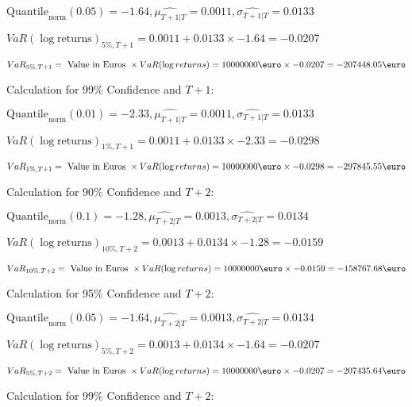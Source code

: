 \indent\indent $\text{Quantile}_\text{norm}(0.05) = -1.64,\hat{\mu_{T+1|T}} = 0.0011, \hat{\sigma_{T+1|T}} = 0.0133$

\indent\indent $VaR(\log \text{returns})_{5\%, T + 1} = 0.0011 + 0.0133\times-1.64 = -0.0207$

\indent\indent $VaR_{5\%, T + 1} = \text{ Value in Euros } \times VaR(\log returns) = 10 000 000 \text{\euro} \times-0.0207 = -207448.05 \text{\euro}$\newline




Calculation for 99\% Confidence and $T+1$:

\indent\indent $\text{Quantile}_\text{norm}(0.01) = -2.33,\hat{\mu_{T+1|T}} = 0.0011, \hat{\sigma_{T+1|T}} = 0.0133$

\indent\indent $VaR(\log \text{returns})_{1\%, T + 1} = 0.0011 + 0.0133\times-2.33 = -0.0298$

\indent\indent $VaR_{1\%, T + 1} = \text{ Value in Euros } \times VaR(\log returns) = 10 000 000 \text{\euro} \times-0.0298 = -297845.55 \text{\euro}$\newline




Calculation for 90\% Confidence and $T+2$:

\indent\indent $\text{Quantile}_\text{norm}(0.1) = -1.28,\hat{\mu_{T+2|T}} = 0.0013, \hat{\sigma_{T+2|T}} = 0.0134$

\indent\indent $VaR(\log \text{returns})_{10\%, T + 2} = 0.0013 + 0.0134\times-1.28 = -0.0159$

\indent\indent $VaR_{10\%, T + 2} = \text{ Value in Euros } \times VaR(\log returns) = 10 000 000 \text{\euro} \times-0.0159 = -158767.68 \text{\euro}$\newline




Calculation for 95\% Confidence and $T+2$:

\indent\indent $\text{Quantile}_\text{norm}(0.05) = -1.64,\hat{\mu_{T+2|T}} = 0.0013, \hat{\sigma_{T+2|T}} = 0.0134$

\indent\indent $VaR(\log \text{returns})_{5\%, T + 2} = 0.0013 + 0.0134\times-1.64 = -0.0207$

\indent\indent $VaR_{5\%, T + 2} = \text{ Value in Euros } \times VaR(\log returns) = 10 000 000 \text{\euro} \times-0.0207 = -207435.64 \text{\euro}$\newline




Calculation for 99\% Confidence and $T+2$:


